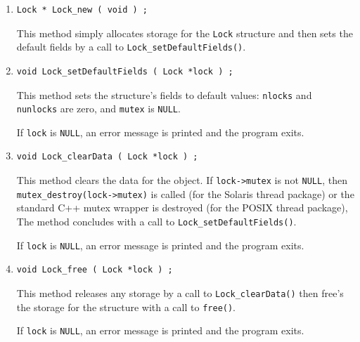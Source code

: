 \begin{enumerate}
\item
\begin{verbatim}
Lock * Lock_new ( void ) ;
\end{verbatim}
This method simply allocates storage for the {\tt Lock} structure 
and then sets the default fields by a call to 
{\tt Lock\_setDefaultFields()}.
\item
\begin{verbatim}
void Lock_setDefaultFields ( Lock *lock ) ;
\end{verbatim}
This method sets the structure's fields to default values:
{\tt nlocks} and {\tt nunlocks} are zero, and {\tt mutex} is {\tt NULL}.
\par {}
If {\tt lock} is {\tt NULL},
an error message is printed and the program exits.
\item
\begin{verbatim}
void Lock_clearData ( Lock *lock ) ;
\end{verbatim}
This method clears the data for the object.
If {\tt lock->mutex} is not {\tt NULL}, 
then {\tt mutex\_destroy(lock->mutex)} is called 
(for the Solaris thread package)
or the standard C++ mutex wrapper is destroyed
(for the POSIX thread package),
The method concludes with a call to {\tt Lock\_setDefaultFields()}.
\par {}
If {\tt lock} is {\tt NULL},
an error message is printed and the program exits.
\item
\begin{verbatim}
void Lock_free ( Lock *lock ) ;
\end{verbatim}
This method releases any storage by a call to 
{\tt Lock\_clearData()} then free's the storage for the 
structure with a call to {\tt free()}.
\par {}
If {\tt lock} is {\tt NULL},
an error message is printed and the program exits.
\end{enumerate}
\par
